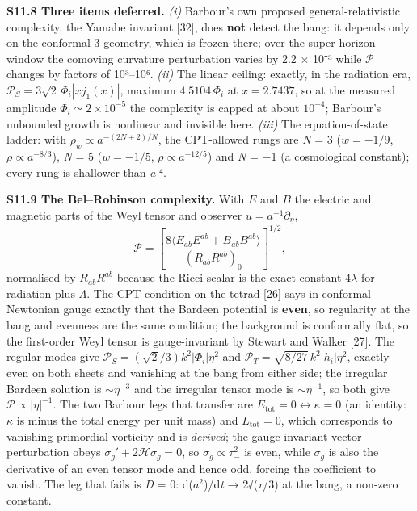 \documentclass[
]{article}
\begin{document}
\textbf{S11.8 Three items deferred.} \emph{(i)} Barbour's own proposed
general-relativistic complexity, the Yamabe invariant {[}32{]}, does
\textbf{not} detect the bang: it depends only on the conformal
3-geometry, which is frozen there; over the super-horizon window the
comoving curvature perturbation varies by 2.2 × 10⁻³ while
\(\mathcal{P}\) changes by factors of 10³--10⁶. \emph{(ii)} The linear
ceiling: exactly, in the radiation era,
\(\mathcal P_S=3\sqrt2\,\Phi_i|xj_1(x)|\), maximum \(4.5104\,\Phi_i\) at
\(x=2.7437\), so at the measured amplitude
\(\Phi_i\simeq2\times10^{-5}\) the complexity is capped at about
\(10^{-4}\); Barbour's unbounded growth is nonlinear and invisible here.
\emph{(iii)} The equation-of-state ladder: with
\(\rho_w\propto a^{-(2N+2)/N}\), the CPT-allowed rungs are \emph{N} = 3
(\(w=-1/9\), \(\rho\propto a^{-8/3}\)), \emph{N} = 5 (\(w=-1/5\),
\(\rho\propto a^{-12/5}\)) and \emph{N} = −1 (a cosmological constant);
every rung is shallower than \emph{a}⁻⁴.

\textbf{S11.9 The Bel--Robinson complexity.} With \(E\) and \(B\) the
electric and magnetic parts of the Weyl tensor and observer
\(u=a^{-1}\partial_\eta\), \[
\mathcal P=\left[
\frac{8\langle E_{ab}E^{ab}+B_{ab}B^{ab}\rangle}
{(R_{ab}R^{ab})_0}
\right]^{1/2},
\] normalised by \(R_{ab}R^{ab}\) because the Ricci scalar is the exact
constant \(4\lambda\) for radiation plus \(\Lambda\). The CPT condition
on the tetrad {[}26{]} says in conformal-Newtonian gauge exactly that
the Bardeen potential is \textbf{even}, so regularity at the bang and
evenness are the same condition; the background is conformally flat, so
the first-order Weyl tensor is gauge-invariant by Stewart and Walker
{[}27{]}. The regular modes give
\(\mathcal P_S=(\sqrt2/3)k^2|\Phi_i|\eta^2\) and
\(\mathcal P_T=\sqrt{8/27}\,k^2|h_i|\eta^2\), exactly even on both
sheets and vanishing at the bang from either side; the irregular Bardeen
solution is \(\sim\eta^{-3}\) and the irregular tensor mode is
\(\sim\eta^{-1}\), so both give \(\mathcal P\propto|\eta|^{-1}\). The
two Barbour legs that transfer are
\(E_{\mathrm{tot}}=0\leftrightarrow\kappa=0\) (an identity: \(\kappa\)
is minus the total energy per unit mass) and \(L_{\mathrm{tot}}=0\),
which corresponds to vanishing primordial vorticity and is
\emph{derived}; the gauge-invariant vector perturbation obeys
\(\sigma_g'+2\mathcal H\sigma_g=0\), so \(\sigma_g\propto\tau_-^2\) is
even, while \(\sigma_g\) is also the derivative of an even tensor mode
and hence odd, forcing the coefficient to vanish. The leg that fails is
\emph{D} = 0: d(\(a^2\))/d\emph{t} → 2√(\emph{r}/3) at the bang, a
non-zero constant.
\end{document}
